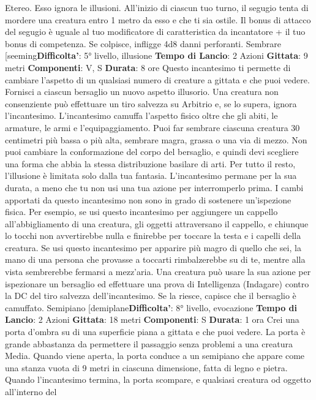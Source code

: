 \begin{multicols}{2}
Etereo. Esso ignora le illusioni.
All’inizio di ciascun tuo turno, il segugio tenta di
mordere una creatura entro 1 metro da esso e che ti
sia ostile. Il bonus di attacco del segugio è uguale al tuo
modificatore di caratteristica da incantatore + il tuo
bonus di competenza. Se colpisce, infligge 4d8 danni
perforanti.
Sembrare
[seeming\textbf{Difficolta'}:
5° livello, illusione
\textbf{Tempo di Lancio}: 2 Azioni
\textbf{Gittata}: 9 metri
\textbf{Componenti}: V, S
\textbf{Durata}: 8 ore
Questo incantesimo ti permette di cambiare l’aspetto di
un qualsiasi numero di creature a gittata e che puoi
vedere. Fornisci a ciascun bersaglio un nuovo aspetto
illusorio. Una creatura non consenziente può effettuare
un tiro salvezza su Arbitrio e, se lo supera, ignora
l’incantesimo.
L’incantesimo camuffa l’aspetto fisico oltre che gli abiti,
le armature, le armi e l’equipaggiamento. Puoi far
sembrare ciascuna creatura 30 centimetri più bassa o
più alta, sembrare magra, grassa o una via di mezzo.
Non puoi cambiare la conformazione del corpo del
bersaglio, e quindi devi scegliere una forma che abbia
la stessa distribuzione basilare di arti. Per tutto il resto,
l’illusione è limitata solo dalla tua fantasia.
L’incantesimo permane per la sua durata, a meno che
tu non usi una tua azione per interromperlo prima.
I cambi apportati da questo incantesimo non sono in
grado di sostenere un’ispezione fisica. Per esempio, se
usi questo incantesimo per aggiungere un cappello
all’abbigliamento di una creatura, gli oggetti
attraversano il cappello, e chiunque lo tocchi non
avvertirebbe nulla e finirebbe per toccare la testa e i
capelli della creatura. Se usi questo incantesimo per
apparire più magro di quello che sei, la mano di una
persona che provasse a toccarti rimbalzerebbe su di te,
mentre alla vista sembrerebbe fermarsi a mezz’aria.
Una creatura può usare la sua azione per ispezionare
un bersaglio ed effettuare una prova di Intelligenza
(Indagare) contro la DC del tiro salvezza 
dell’incantesimo. Se la riesce, capisce che il bersaglio è
camuffato.
Semipiano
[demiplane\textbf{Difficolta'}:
8° livello, evocazione
\textbf{Tempo di Lancio}: 2 Azioni
\textbf{Gittata}: 18 metri
\textbf{Componenti}: S
\textbf{Durata}: 1 ora
Crei una porta d’ombra su di una superficie piana a
gittata e che puoi vedere. La porta è grande
abbastanza da permettere il passaggio senza problemi
a una creatura Media. Quando viene aperta, la porta
conduce a un semipiano che appare come una stanza
vuota di 9 metri in ciascuna dimensione, fatta di legno e
pietra. Quando l’incantesimo termina, la porta
scompare, e qualsiasi creatura od oggetto all’interno del

\end{multicols}
